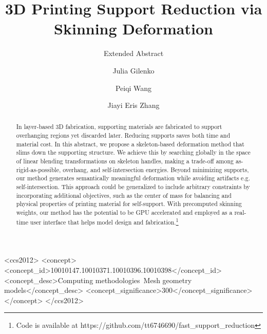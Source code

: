 \documentclass[sigconf]{acmart}
\begin{document}
\title{3D Printing Support Reduction via Skinning Deformation}
\subtitle{Extended Abstract}

\author{Julia Gilenko}

\author{Peiqi Wang}

\author{Jiayi Eris Zhang}

\renewcommand{\shortauthors}{Julia G. Mark W. Eris Z.}

\begin{abstract}
 
In layer-based 3D fabrication, supporting materials are fabricated to support overhanging regions yet discarded later. Reducing supports saves both time and material cost. In this abstract, we propose a skeleton-based deformation method that slims down the supporting structure. We achieve this by searching globally in the space of linear blending transformations on skeleton handles, making a trade-off among as-rigid-as-possible, overhang, and self-intersection energies. Beyond minimizing supports, our method generates semantically meaningful deformation while avoiding artifacts e.g. self-intersection. This approach could be generalized to include arbitrary constraints by incorporating additional objectives, such as the center of mass for balancing and physical properties of printing material for self-support. With precomputed skinning weights, our method has the potential to be GPU accelerated and employed as a real-time user interface that helps model design and fabrication.\footnote{Code is available at https://github.com/tt6746690/fast\_support\_reduction}
\end{abstract}

%
%
\begin{CCSXML}
    <ccs2012>
    <concept>
    <concept_id>10010147.10010371.10010396.10010398</concept_id>
    <concept_desc>Computing methodologies~Mesh geometry models</concept_desc>
    <concept_significance>300</concept_significance>
    </concept>
    </ccs2012>
\end{CCSXML}

\end{document}
